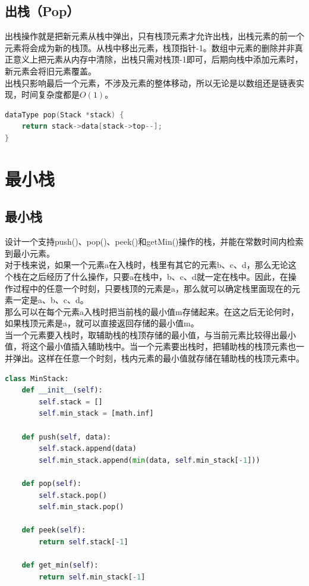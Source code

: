\subsection{出栈（Pop）}

出栈操作就是把新元素从栈中弹出，只有栈顶元素才允许出栈，出栈元素的前一个元素将会成为新的栈顶。从栈中移出元素，栈顶指针-1。数组中元素的删除并非真正意义上把元素从内存中清除，出栈只需对栈顶-1即可，后期向栈中添加元素时，新元素会将旧元素覆盖。 \\

出栈只影响最后一个元素，不涉及元素的整体移动，所以无论是以数组还是链表实现，时间复杂度都是$ O(1) $。 \\


\begin{lstlisting}[language=C]
dataType pop(Stack *stack) {
    return stack->data[stack->top--];
}
\end{lstlisting}

\newpage

\section{最小栈}

\subsection{最小栈}

设计一个支持push()、pop()、peek()和getMin()操作的栈，并能在常数时间内检索到最小元素。 \\

对于栈来说，如果一个元素a在入栈时，栈里有其它的元素b、c、d，那么无论这个栈在之后经历了什么操作，只要a在栈中，b、c、d就一定在栈中。因此，在操作过程中的任意一个时刻，只要栈顶的元素是a，那么就可以确定栈里面现在的元素一定是a、b、c、d。 \\

那么可以在每个元素a入栈时把当前栈的最小值m存储起来。在这之后无论何时，如果栈顶元素是a，就可以直接返回存储的最小值m。 \\

当一个元素要入栈时，取辅助栈的栈顶存储的最小值，与当前元素比较得出最小值，将这个最小值插入辅助栈中。当一个元素要出栈时，把辅助栈的栈顶元素也一并弹出。这样在任意一个时刻，栈内元素的最小值就存储在辅助栈的栈顶元素中。 \\


\begin{lstlisting}[language=Python]
class MinStack:
    def __init__(self):
        self.stack = []
        self.min_stack = [math.inf]
    
    def push(self, data):
        self.stack.append(data)
        self.min_stack.append(min(data, self.min_stack[-1]))
    
    def pop(self):
        self.stack.pop()
        self.min_stack.pop()
    
    def peek(self):
        return self.stack[-1]
    
    def get_min(self):
        return self.min_stack[-1]
\end{lstlisting}

